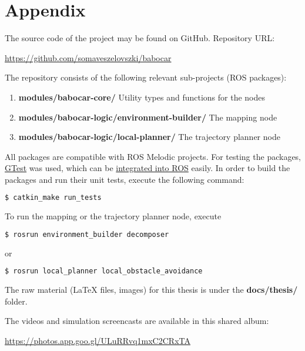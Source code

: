 \chapter*{Appendix}

The source code of the project may be found on GitHub. Repository URL:

\begin{center}
\href{https://github.com/somaveszelovszki/babocar}{https://github.com/somaveszelovszki/babocar}
\end{center}

The repository consists of the following relevant sub-projects (ROS packages):

\begin{enumerate}
\item \textbf{modules/babocar-core/} Utility types and functions for the nodes
\item \textbf{modules/babocar-logic/environment-builder/} The mapping node
\item \textbf{modules/babocar-logic/local-planner/} The trajectory planner node
\end{enumerate}

All packages are compatible with ROS Melodic projects. For testing the packages, \href{https://github.com/google/googletest}{GTest} was used, which can be \href{http://wiki.ros.org/gtest}{integrated into ROS} easily. In order to build the packages and run their unit tests, execute the following command:

\begin{lstlisting}[language=bash]
$ catkin_make run_tests
\end{lstlisting}

To run the mapping or the trajectory planner node, execute

\begin{lstlisting}[language=bash]
$ rosrun environment_builder decomposer
\end{lstlisting}

or

\begin{lstlisting}[language=bash]
$ rosrun local_planner local_obstacle_avoidance
\end{lstlisting}

The raw material (LaTeX files, images) for this thesis is under the \textbf{docs/thesis/} folder.

The videos and simulation screencasts are available in this shared album:

\begin{center}
	\href{https://photos.app.goo.gl/ULuRRvq1mxC2CRxTA}{https://photos.app.goo.gl/ULuRRvq1mxC2CRxTA}
\end{center}